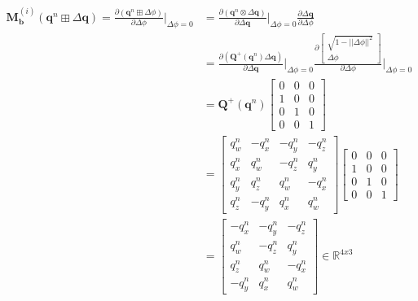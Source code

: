 \documentclass[a4paper]{report}
\numberwithin{figure}{section}
\newcommand{\R}{\mathbb{R}}
\begin{document}
\begin{appendices}
\begin{equation}
  \begin{aligned}
  \mathbf{M}^{(i)}_{\mathbf{b}}(\mathbf{q}^n \boxplus \Delta \mathbf{q}) = 
    \frac{\partial (\mathbf{q}^{n} \boxplus \Delta \phi)}{\partial \Delta \phi} 
    \bigg|_{\Delta \phi = 0} & =
\frac{\partial (\mathbf{q}^{n} \otimes \Delta \mathbf{q})}{\partial \Delta \mathbf{q}}
    \bigg|_{\Delta \phi = 0} 
    \frac{\partial \Delta \mathbf{q}}{\partial \Delta \phi} \\
    & =
    \frac{\partial (\mathbf{Q}^{+}(\mathbf{q}^{n}) \Delta \mathbf{q})}{\partial \Delta \mathbf{q}}
    \bigg|_{\Delta \phi = 0}
    \frac{\partial \begin{bmatrix} \sqrt{1-||\Delta \phi||^2} \\ \Delta \phi \end{bmatrix}}{\partial \Delta \phi}
    \bigg|_{\Delta \phi = 0} \\
    & =
\mathbf{Q}^{+}(\mathbf{q}^{n})
      \begin{bmatrix} 
        0 & 0 & 0 \\  
        1 & 0 & 0 \\  
        0 & 1 & 0 \\  
        0 & 0 & 1
      \end{bmatrix} \\
    & =
      \begin{bmatrix} 
        q_w^{n} & -q_x^{n} & -q_y^{n} & -q_z^{n}\\  
        q_x^{n} & q_w^{n} & -q_z^{n} & q_y^{n}\\  
        q_y^{n} & q_z^{n} & q_w^{n} & -q_x^{n}\\
        q_z^{n} & -q_y^{n} & q_x^{n} & q_w^{n}
      \end{bmatrix}
      \begin{bmatrix} 
        0 & 0 & 0 \\  
        1 & 0 & 0 \\  
        0 & 1 & 0 \\  
        0 & 0 & 1
      \end{bmatrix} \\ 
      & = 
      \begin{bmatrix} 
        -q_x^{n} & -q_y^{n} & -q_z^{n}\\  
        q_w^{n} & -q_z^{n} & q_y^{n}\\  
        q_z^{n} & q_w^{n} & -q_x^{n}\\
        -q_y^{n} & q_x^{n} & q_w^{n}
      \end{bmatrix} \in \R^{4x3}
  \end{aligned}
\end{equation}


\end{appendices}
\end{document}
